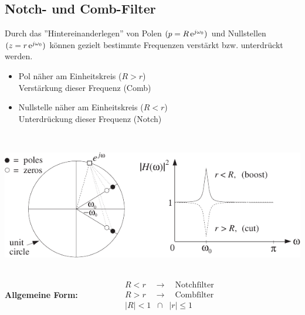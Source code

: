 	\subsection{Notch- und Comb-Filter}
		\begin{minipage}{0.47\textwidth}
			Durch das ''Hintereinanderlegen'' von Polen $(p = R\,\mathrm{e}^{j\omega_0})$ und Nullstellen $(z = r\,\mathrm{e}^{j\omega_0})$ können gezielt bestimmte Frequenzen verstärkt bzw. unterdrückt werden.\\[-0.3cm]
			\begin{itemize}
			\item Pol näher am Einheitskreis ($R>r$)\\
			\text{$\;\Rightarrow\quad$} Verstärkung dieser Frequenz (Comb)\\[-0.3cm]
			\item Nullstelle näher am Einheitskreis ($R<r$)\\
			\text{$\;\Rightarrow\quad$} Unterdrückung dieser Frequenz (Notch)\\[-0.3cm]
			\end{itemize}
		\end{minipage}\begin{minipage}{0.03\textwidth}$ $\end{minipage}
		\begin{minipage}{0.5\textwidth}
			\includegraphics[width = 1\textwidth]{pic/notch.pdf}	
		\end{minipage}\\[0.2cm]
		\textbf{Allgemeine Form:}$\qquad$
		$\qquad\quad\begin{array}{l}R<r\quad \rightarrow\quad\text{Notchfilter}\\R>r\quad \rightarrow\quad\text{Combfilter}\\[0.2cm]
		|R|<1\;\;\cap\;\;|r|\leq1\end{array}$\\[0.2cm]

